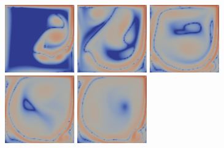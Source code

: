\documentclass[english, nochinese]{pkupaper}
\begin{document}
\begin{figure}[htbp]
{
\centering
{
\includegraphics[width=3cm]{Results/Figure02a.pdf}
\includegraphics[width=3cm]{Results/Figure02b.pdf}
\includegraphics[width=3cm]{Results/Figure02c.pdf}
\includegraphics[width=3cm]{Results/Figure02d.pdf}
\includegraphics[width=3cm]{Results/Figure02e.pdf}
}

}
\end{figure}
\end{document}
